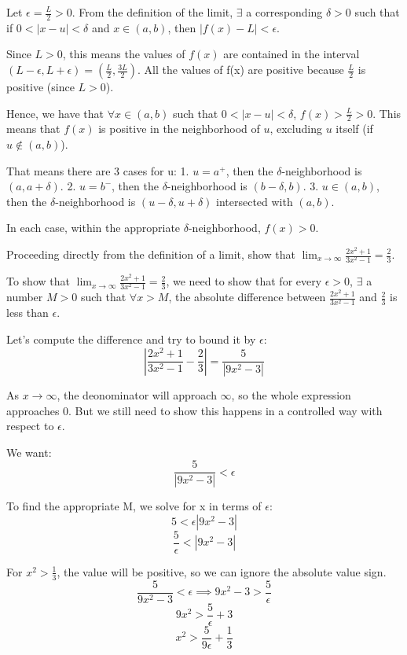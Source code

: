 \documentclass[answers]{exam}
\theoremstyle{remark}
\theoremstyle{definition}
\begin{document}
\begin{questions}
\begin{solution}
Let $\epsilon = \frac{L}{2} > 0$. From the definition of the limit, $\exists$
a corresponding $\delta > 0$ such that if $0 < |x-u| < \delta$ and $x \in (a, b)$,
then $|f(x) - L| < \epsilon$.

Since $L > 0$, this means the values of $f(x)$ are contained in the interval
$(L - \epsilon, L + \epsilon) = (\frac{L}{2}, \frac{3 L}{2})$. All the
values of f(x) are positive because $\frac{L}{2}$ is positive (since $L > 0$).

Hence, we have that $\forall x \in (a, b)$ such that $0 < |x-u| < \delta$,
$f(x) > \frac{L}{2} > 0$. This means that $f(x)$ is positive in the neighborhood
of $u$, excluding $u$ itself (if $u \notin (a, b)$).

That means there are 3 cases for u:
1. $u = a^+$, then the $\delta$-neighborhood is $(a, a + \delta)$.
2. $u = b^-$, then the $\delta$-neighborhood is $(b - \delta, b)$.
3. $u \in (a, b)$, then the $\delta$-neighborhood is $(u - \delta, u + \delta)$ intersected with $(a, b)$.

In each case, within the appropriate $\delta$-neighborhood, $f(x) > 0$.

\end{solution}

\question[4] Proceeding directly from the definition of a limit, show that $\lim_{ x \to \infty} \frac{2x^2+1}{3x^2-1}= \frac{2}{3}$.
\begin{solution}

To show that $\lim_{x \to \infty} \frac{2x^2+1}{3x^2-1} = \frac{2}{3}$, we need
to show that for every $\epsilon > 0$, $\exists$ a number $M > 0$
such that $\forall x > M$, the absolute difference between $\frac{2x^2+1}{3x^2-1}$
and $\frac{2}{3}$ is less than $\epsilon$.

Let's compute the difference and try to bound it by $\epsilon$:
\[|\frac{2x^2+1}{3x^2-1} - \frac{2}{3}| = \frac{5}{|9x^2 - 3|}\]

As $x \to \infty$, the deonominator will approach $\infty$,
so the whole expression approaches 0. But we still need to show this happens
in a controlled way with respect to $\epsilon$.

We want:
\[\frac{5}{|9x^2 - 3|} < \epsilon\]

To find the appropriate M, we solve for x in terms of $\epsilon$:
\[5 < \epsilon|9x^2 - 3|\]
\[\frac{5}{\epsilon} < |9x^2 - 3|\]

For $x^2 > \frac{1}{3}$, the value will be positive,
so we can ignore the absolute value sign.
\[\frac{5}{9x^2 - 3} < \epsilon \implies 9x^2 - 3 > \frac{5}{\epsilon}\]
\[9x^2 > \frac{5}{\epsilon} + 3\]
\[x^2 > \frac{5}{9 \epsilon} + \frac{1}{3}\]


\end{solution}
\end{questions}
\end{document}
